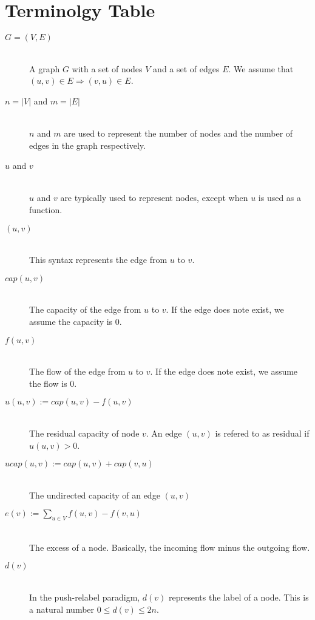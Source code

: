 \section{Terminolgy Table}

\begin{description}
  \item[$G=(V, E)$] \hfill \\
  A graph $G$ with a set of nodes $V$ and a set of edges $E$. We assume that $(u, v)\in E \Rightarrow (v, u) \in E$.
  
  \item[$n=|V|$ and $m=|E|$] \hfill \\
  $n$ and $m$ are used to represent the number of nodes and the number of edges in the graph respectively.
	
  \item[$u$ and $v$] \hfill \\
  $u$ and $v$ are typically used to represent nodes, except when $u$ is used as a function.
  
  \item[$(u, v)$] \hfill \\
  This syntax represents the edge from $u$ to $v$.
    
  \item[$cap(u, v)$] \hfill \\
  The capacity of the edge from $u$ to $v$. If the edge does note exist, we assume the capacity is $0$.
  
  \item[$f(u, v)$] \hfill \\
  The flow of the edge from $u$ to $v$. If the edge does note exist, we assume the flow is $0$.
  
  \item[$u(u, v):=cap(u, v)-f(u, v)$] \hfill \\
  The residual capacity of node $v$. An edge $(u, v)$ is refered to as residual if $u(u, v)>0$.

  \item[$ucap(u, v):=cap(u, v)+cap(v, u)$] \hfill \\
  The undirected capacity of an edge $(u, v)$ 
  
  \item[$e(v):= \sum\limits_{u\in V}{f(u, v) - f(v, u)}$] \hfill \\
	The excess of a node. Basically, the incoming flow minus the outgoing flow.

  \item[$d(v)$] \hfill \\
	In the push-relabel paradigm, $d(v)$ represents the label of a node. This is a natural number $0 \leq d(v) \leq 2n$.
  
\end{description}